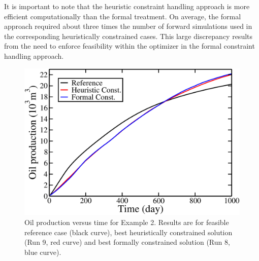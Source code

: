 \documentclass[twocolumn,numbook]{svjour3}          %
\begin{document}
It is important to note that the heuristic constraint handling approach is
more efficient computationally than the formal treatment. On average,
the formal approach required about three times the number of forward
simulations used in the corresponding heuristically constrained cases. This
large discrepancy results from the need to enforce feasibility within the
optimizer in the formal constraint handling approach.


\begin{figure} [ht]
\begin{center}
\includegraphics[totalheight=2.17in,angle=0]{spe10TopLayerRevenue.pdf}
\end{center}
\caption{Oil production versus time for Example 2. Results are for
  feasible reference case (black curve), best heuristically constrained solution (Run 9, red curve)
  and best formally constrained solution (Run 8, blue curve).}
\label{fig:SPE10TopLayerRevenue}
\end{figure}
\end{document}
